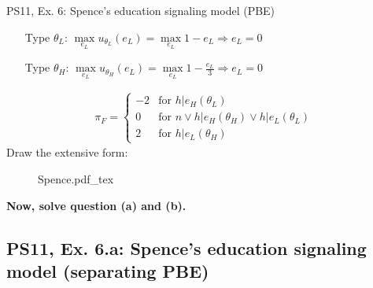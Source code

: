 \begin{frame}{PS11, Ex. 6: Spence’s education signaling model (PBE)}
\begin{multicols}{2}
\begin{itemize}
        \item[Type $\theta_L$:] $\max\limits_{e_L}u_{\theta_L}(e_L)=\max\limits_{e_L}1-e_L\Rightarrow e_L=0$\\
        \item[Type $\theta_H$:] $\max\limits_{e_L}u_{\theta_H}(e_L)=\max\limits_{e_L}1-\frac{e_L}{3}\Rightarrow e_L=0$
      \end{itemize}\vspace{-13pt}
      \begin{align*}
        \pi_{F}=\left\{\begin{array}{rl}
           -2 & \text{for }h|e_H(\theta_L) \\
            0 & \text{for }n\vee h|e_H(\theta_H)\vee h|e_L(\theta_L) \\
            2 & \text{for }h|e_L(\theta_H)
        \end{array}\right.
      \end{align*}
      \vfill\null\columnbreak
      Draw the extensive form:\vspace{-14pt}
      \begin{figure}[!h]
        \center{}
        {Spence.pdf_tex}
      \end{figure}\vspace{-4pt}
      \textbf{Now, solve question (a) and (b).}
      \vfill\null
    \end{multicols}
\end{frame}


\subsection{PS11, Ex. 6.a: Spence’s education signaling model (separating PBE)}

